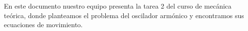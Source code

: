 
\noindent 				%
En este documento nuestro equipo presenta la tarea 2 del curso de mecánica teórica, donde planteamos 
el problema del oscilador armónico y encontramos sus ecuaciones de movimiento.